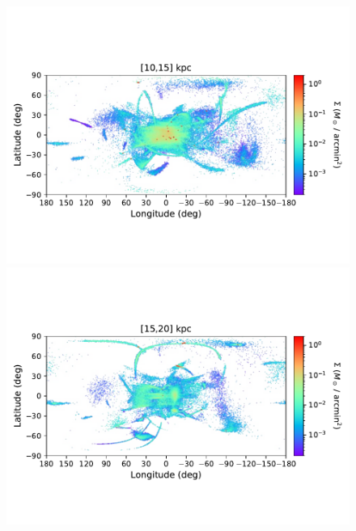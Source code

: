\begin{figure}[h!]
\begin{center}
            \includegraphics[clip=true, trim = 0mm 20mm 0mm 20mm, width=\columnwidth]{images/PII_ensemble_LB_D10-15_mass_est_new.pdf}
            \includegraphics[clip=true, trim = 0mm 20mm 0mm 20mm, width=\columnwidth]{images/PII_ensemble_LB_D15-20_mass_est_new.pdf}


\end{center}
\end{figure}
